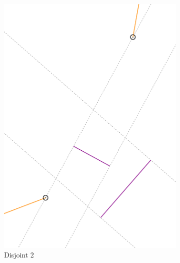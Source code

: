 \documentclass[11pt,a4paper,english]{article}
\begin{document}
\begin{figure}[h]
\begin{subfigure}[b]{0.3\textwidth}
		\includegraphics[width=\textwidth]{two_unbounded_rays_2}
    	\caption{Disjoint 2 \label{fig:two_unbounded_rays_2}}
	\end{subfigure}
	\qquad
	\begin{subfigure}[b]{0.3\textwidth}

\end{subfigure}
\end{figure}
\end{document}
